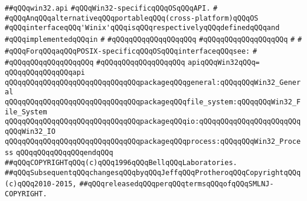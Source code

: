 \label{src/lib/std/src/win32/win32.api}
\verb|##qQQqwin32.api|\newline
\newline
\newline
\newline
\verb|#qQQqWin32-specificqQQqOSqQQqAPI.|\newline
\verb|#|\newline
\verb|#qQQqAnqQQqalternativeqQQqportableqQQq(cross-platform)qQQqOS|\newline
\verb|#qQQqinterfaceqQQq'Winix'qQQqisqQQqrespectivelyqQQqdefinedqQQqand|\newline
\verb|#qQQqimplementedqQQqin|\newline
\verb|#|\newline
\verb|#qQQqqQQqqQQqqQQqqQQq|\newline
\verb|#qQQqqQQqqQQqqQQqqQQq|\newline
\verb|#|\newline
\verb|#|\newline
\verb|#qQQqForqQQqaqQQqPOSIX-specificqQQqOSqQQqinterfaceqQQqsee:|\newline
\verb|#|\newline
\verb|#qQQqqQQqqQQqqQQqqQQq|\newline
\verb|#qQQqqQQqqQQqqQQqqQQq|\newline
\newline
\verb|apiqQQqWin32qQQq=|\newline
\verb|qQQqqQQqqQQqqQQqapi|\newline
\verb|qQQqqQQqqQQqqQQqqQQqqQQqqQQqqQQqpackageqQQqgeneral:qQQqqQQqWin32_General|\newline
\verb|qQQqqQQqqQQqqQQqqQQqqQQqqQQqqQQqpackageqQQqfile_system:qQQqqQQqWin32_File_System|\newline
\verb|qQQqqQQqqQQqqQQqqQQqqQQqqQQqqQQqpackageqQQqio:qQQqqQQqqQQqqQQqqQQqqQQqqQQqWin32_IO|\newline
\verb|qQQqqQQqqQQqqQQqqQQqqQQqqQQqqQQqpackageqQQqprocess:qQQqqQQqWin32_Process|\newline
\verb|qQQqqQQqqQQqqQQqendqQQq|\newline
\newline
\newline
\newline
\newline
\verb|##qQQqCOPYRIGHTqQQq(c)qQQq1996qQQqBellqQQqLaboratories.|\newline
\verb|##qQQqSubsequentqQQqchangesqQQqbyqQQqJeffqQQqProtheroqQQqCopyrightqQQq(c)qQQq2010-2015,|\newline
\verb|##qQQqreleasedqQQqperqQQqtermsqQQqofqQQqSMLNJ-COPYRIGHT.|\newline


